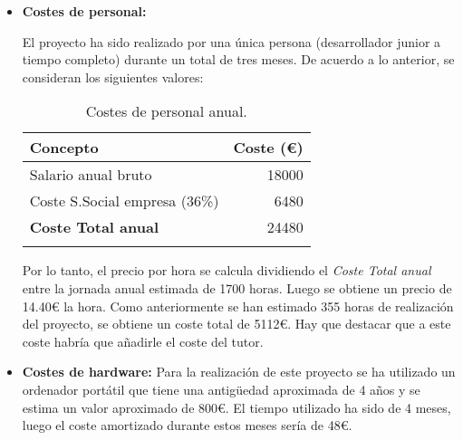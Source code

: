 \begin{itemize}
	\item\textbf{Costes de personal:}

El proyecto ha sido realizado por una única persona (desarrollador junior a tiempo completo) durante un total de tres meses.
De acuerdo a lo anterior, se consideran los siguientes valores:

\begin{longtable}[]{@{}lr@{}}
\toprule
\begin{minipage}[b]{0.38\columnwidth}\raggedright\strut
\textbf{Concepto}\strut
\end{minipage} & \begin{minipage}[b]{0.20\columnwidth}\raggedleft\strut
\textbf{Coste (\euro{}) }\strut
\end{minipage}\tabularnewline
\midrule
\endhead
\begin{minipage}[t]{0.38\columnwidth}\raggedright\strut
Salario anual bruto\strut
\end{minipage} & \begin{minipage}[t]{0.20\columnwidth}\raggedleft\strut
{18000}\strut
\end{minipage}\tabularnewline
\begin{minipage}[t]{0.38\columnwidth}\raggedright\strut
Coste S.Social empresa (36\%)\strut
\end{minipage} & \begin{minipage}[t]{0.20\columnwidth}\raggedleft\strut
6480\strut
\end{minipage}\tabularnewline
\midrule
\begin{minipage}[t]{0.38\columnwidth}\raggedright\strut
\textbf{Coste Total anual}\strut
\end{minipage} & \begin{minipage}[t]{0.20\columnwidth}\raggedleft\strut
24480\strut
\end{minipage}\tabularnewline
\bottomrule
\caption{Costes de personal anual.}
\end{longtable}


Por lo tanto, el precio por hora se calcula dividiendo el \emph{Coste Total anual} entre la jornada anual estimada de 1700 horas. Luego se obtiene un precio de 14.40\euro{} la hora. Como anteriormente se han estimado 355 horas de realización del proyecto, se obtiene un coste total de 5112\euro{}. 
Hay que destacar que a este coste habría que añadirle el coste del tutor. 

\newpage

\item\textbf{Costes de hardware:}
Para la realización de este proyecto se ha utilizado un ordenador portátil que tiene una antigüedad aproximada de 4 años y 
se estima un valor aproximado de 800\euro{}. El tiempo utilizado ha sido de 4 meses, luego el coste amortizado durante estos meses sería de 48\euro{}.





\end{itemize}

